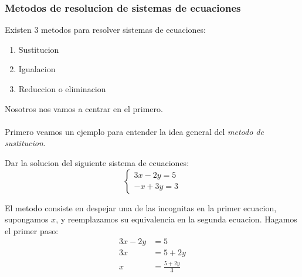 \documentclass{article}
\begin{document}
\subsubsection*{Metodos de resolucion de sistemas de ecuaciones}
\begin{normalsize}
Existen 3 metodos para resolver sistemas de ecuaciones:
\begin{enumerate}
	\item Sustitucion
	\item Igualacion
	\item Reduccion o eliminacion
\end{enumerate}
Nosotros nos vamos a centrar en el primero.\\\\
Primero veamos un ejemplo para entender la idea general del \textit{metodo de sustitucion}.

\begin{ejemplo}
Dar la solucion del siguiente sistema de ecuaciones:
	\begin{equation}
		\begin{cases}
		3x-2y=5\nonumber\\
		-x+3y=3	
		\end{cases}
	\end{equation}

El metodo consiste en despejar una de las incognitas en la primer ecuacion, supongamos $x$, y reemplazamos su equivalencia en la segunda ecuacion.
Hagamos el primer paso:
	\begin{align}
	3x-2y&=5\nonumber\\
	3x&=5+2y\nonumber\\
	x&=\frac{5+2y}{3}\nonumber
	\end{align}
\end{ejemplo}


\end{normalsize}
\end{document}
